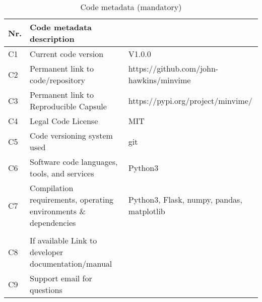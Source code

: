\documentclass[preprint,12pt, a4paper]{elsarticle}
\begin{document}
\begin{table}[!h]
\begin{tabular}{|l|p{6.5cm}|p{6.5cm}|}
\hline
\textbf{Nr.} & \textbf{Code metadata description} & \textbf{} \\
\hline
C1 & Current code version & V1.0.0 \\
\hline
C2 & Permanent link to code/repository & https://github.com/john-hawkins/minvime \\
\hline
C3  & Permanent link to Reproducible Capsule & https://pypi.org/project/minvime/ \\
\hline
C4 & Legal Code License   & MIT \\
\hline
C5 & Code versioning system used & git \\
\hline
C6 & Software code languages, tools, and services & Python3\\
\hline
C7 & Compilation requirements, operating environments \& dependencies & Python3, Flask, numpy, pandas, matplotlib\\
\\
\hline
C8 & If available Link to developer documentation/manual & \\
\hline
C9 & Support email for questions & \\
\hline
\end{tabular}
\caption{Code metadata (mandatory)}
\label{} 
\end{table}
\end{document}
